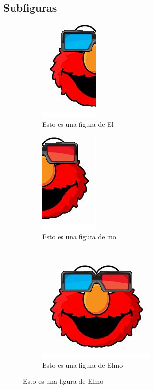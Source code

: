 \documentclass{article}
\begin{document}
    \subsection{Subfiguras}
        \begin{figure}[ht]
            \centering
            \begin{subfigure}{0.45\textwidth}
                \centering
                \includegraphics[scale=0.5]{ElmoA.png}
                \caption{Esto es una figura de El}
                \label{fig:El}
            \end{subfigure}
            \begin{subfigure}{0.45\textwidth}
                \centering
                \includegraphics[scale=0.5]{ElmoB.png}
                \caption{Esto es una figura de mo}
                \label{fig:mo}
            \end{subfigure} \\
            \begin{subfigure}{0.45\textwidth}
                \centering
                \includegraphics[scale=0.5]{Elmo.png}
                \caption{Esto es una figura de Elmo}
                \label{fig:Elmo}
            \end{subfigure}
            \label{fig:El-mo}
        \end{figure}
    
\end{document}
